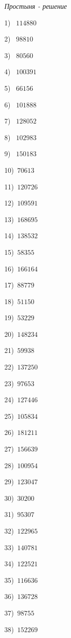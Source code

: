 \documentclass{article}
\begin{document}
 
\begin{center} 
   \large{\textit{Простыня - решение}} 
\end{center}\begin{multicols}{2}
1)$\,\,\,\,\,114880$ \par 
2)$\,\,\,\,\,98810$ \par 
3)$\,\,\,\,\,80560$ \par 
4)$\,\,\,\,\,100391$ \par 
5)$\,\,\,\,\,66156$ \par 
6)$\,\,\,\,\,101888$ \par 
7)$\,\,\,\,\,128052$ \par 
8)$\,\,\,\,\,102983$ \par 
9)$\,\,\,\,\,150183$ \par 
10)$\,\,\,70613$ \par 
11)$\,\,\,120726$ \par 
12)$\,\,\,109591$ \par 
13)$\,\,\,168695$ \par 
14)$\,\,\,138532$ \par 
15)$\,\,\,58355$ \par 
16)$\,\,\,166164$ \par 
17)$\,\,\,88779$ \par 
18)$\,\,\,51150$ \par 
19)$\,\,\,53229$ \par 
20)$\,\,\,148234$ \par 
21)$\,\,\,59938$ \par 
22)$\,\,\,137250$ \par 
23)$\,\,\,97653$ \par 
24)$\,\,\,127446$ \par 
25)$\,\,\,105834$ \par 
26)$\,\,\,181211$ \par 
27)$\,\,\,156639$ \par 
28)$\,\,\,100954$ \par 
29)$\,\,\,123047$ \par 
30)$\,\,\,30200$ \par 
31)$\,\,\,95307$ \par 
32)$\,\,\,122965$ \par 
33)$\,\,\,140781$ \par 
34)$\,\,\,122521$ \par 
35)$\,\,\,116636$ \par 
36)$\,\,\,136728$ \par 
37)$\,\,\,98755$ \par 
38)$\,\,\,152269$ \par 

\end{multicols}
\end{document}
